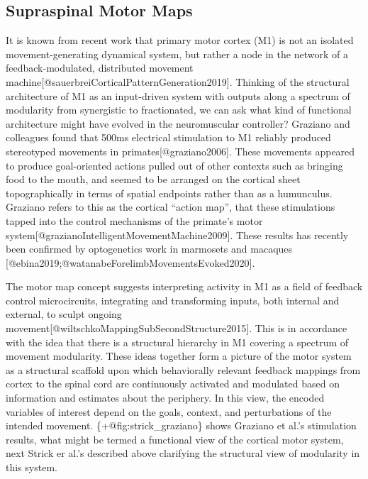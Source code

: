 \documentclass[../main.tex]{subfiles}
\begin{document}
\subsection{Supraspinal Motor Maps}\label{supraspinal-motor-maps}

It is known from recent work that primary motor cortex (M1) is not an isolated movement-generating dynamical system, but rather a node in the network of a feedback-modulated, distributed movement machine{[}@sauerbreiCorticalPatternGeneration2019{]}. Thinking of the structural architecture of M1 as an input-driven system with outputs along a spectrum of modularity from synergistic to fractionated, we can ask what kind of functional architecture might have evolved in the neuromuscular controller? Graziano and colleagues found that 500ms electrical stimulation to M1 reliably produced stereotyped movements in primates{[}@graziano2006{]}. These movements appeared to produce goal-oriented actions pulled out of other contexts such as bringing food to the mouth, and seemed to be arranged on the cortical sheet topographically in terms of spatial endpoints rather than as a humunculus. Graziano refers to this as the cortical ``action map'', that these stimulations tapped into the control mechanisms of the primate's motor system{[}@grazianoIntelligentMovementMachine2009{]}. These results has recently been confirmed by optogenetics work in marmosets and macaques {[}@ebina2019;@watanabeForelimbMovementsEvoked2020{]}.

The motor map concept suggests interpreting activity in M1 as a field of feedback control microcircuits, integrating and transforming inputs, both internal and external, to sculpt ongoing movement{[}@wiltschkoMappingSubSecondStructure2015{]}. This is in accordance with the idea that there is a structural hierarchy in M1 covering a spectrum of movement modularity. These ideas together form a picture of the motor system as a structural scaffold upon which behaviorally relevant feedback mappings from cortex to the spinal cord are continuously activated and modulated based on information and estimates about the periphery. In this view, the encoded variables of interest depend on the goals, context, and perturbations of the intended movement. \{+@fig:strick\_graziano\} shows Graziano et al.'s stimulation results, what might be termed a functional view of the cortical motor system, next Strick er al.'s described above clarifying the structural view of modularity in this system.
\end{document}
